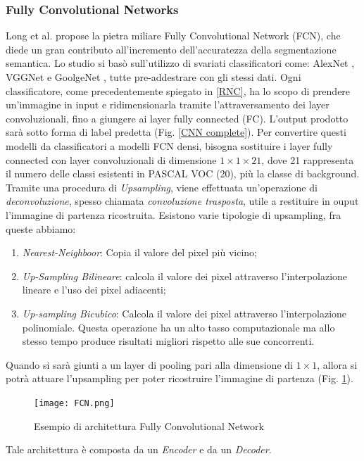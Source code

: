 \subsubsection{Fully Convolutional Networks}
Long et al. \cite{fcn} propose la pietra miliare Fully Convolutional Network (FCN), 
che diede un gran contributo all’incremento dell’accuratezza della segmentazione 
semantica. Lo studio si basò sull’utilizzo di svariati classificatori come: AlexNet \cite{alexnet}, 
VGGNet\cite{vggNet} e GoolgeNet \cite{googleNet}, tutte pre-addestrare con gli stessi dati. 
Ogni classificatore, come precedentemente spiegato in \ref{RNC}, ha lo scopo di prendere 
un'immagine in input e ridimensionarla tramite l’attraversamento dei layer 
convoluzionali, fino a giungere ai layer fully connected (FC). L’output prodotto 
sarà sotto forma di label predetta (Fig. \ref{CNN complete}). Per convertire questi modelli da 
classificatori a modelli FCN densi, bisogna sostituire i layer fully connected con 
layer convoluzionali di dimensione $1 \times 1 \times 21$, dove 21 rappresenta il numero delle 
classi esistenti in PASCAL VOC (20), più la classe di background. Tramite una 
procedura di \emph{Upsampling}, viene effettuata un’operazione di \emph{deconvoluzione}, spesso 
chiamata \emph{convoluzione trasposta}, utile a restituire in ouput l’immagine di partenza 
ricostruita. Esistono varie tipologie di upsampling, fra queste abbiamo:
\begin{enumerate}
    \item \emph{Nearest-Neighboor}: Copia il valore del pixel più vicino;
    \item \emph{Up-Sampling Bilineare}: calcola il valore dei pixel attraverso l’interpolazione lineare e l’uso dei pixel adiacenti;
    \item \emph{Up-sampling Bicubico}: Calcola il valore dei pixel attraverso l’interpolazione polinomiale. Questa operazione ha un alto tasso computazionale ma allo stesso tempo produce risultati migliori rispetto alle sue concorrenti. 
\end{enumerate}
Quando si sarà giunti a un layer di pooling pari alla dimensione di $1 \times 1$, allora 
si potrà attuare l’upsampling per poter ricostruire l’immagine di partenza (Fig. \ref{FCN}). 
\begin{figure}[H]
    \centering
    \texttt{[image: FCN.png]}
    \centering
    \caption{Esempio di architettura Fully Convolutional Network}
    \label{FCN}
\end{figure}
Tale architettura è composta da un \emph{Encoder} e da un \emph{Decoder}.
